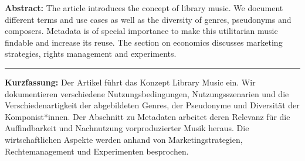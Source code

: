 \textbf{Abstract:} The article introduces the concept of library music.
We document different terms and use cases as well as the diversity of
genres, pseudonyms and composers. Metadata is of special importance to
make this utilitarian music findable and increase its reuse. The section
on economics discusses marketing strategies, rights management and
experiments.

\begin{center}\rule{0.5\linewidth}{0.5pt}\end{center}

\textbf{Kurzfassung:} Der Artikel führt das Konzept Library Music ein.
Wir dokumentieren verschiedene Nutzungsbedingungen, Nutzungsszenarien
und die Verschiedenartigkeit der abgebildeten Genres, der Pseudonyme und
Diversität der Komponist*innen. Der Abschnitt zu Metadaten arbeitet
deren Relevanz für die Auffindbarkeit und Nachnutzung vorproduzierter
Musik heraus. Die wirtschaftlichen Aspekte werden anhand von
Marketingstrategien, Rechtemanagement und Experimenten besprochen.

